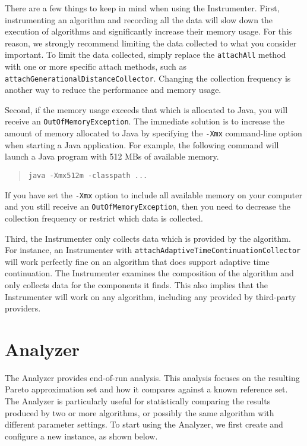 There are a few things to keep in mind when using the Instrumenter. First, instrumenting an algorithm and recording all the data will slow down the execution of algorithms and significantly increase their memory usage.  For this reason, we strongly recommend limiting the data collected to what you consider important.  To limit the data collected, simply replace the \texttt{attachAll} method with one or more specific attach methods, such as \texttt{attachGenerationalDistanceCollector}.  Changing the collection frequency is another way to reduce the performance and memory usage.

Second, if the memory usage exceeds that which is allocated to Java, you will receive an \texttt{OutOfMemoryException}.  The immediate solution is to increase the amount of memory allocated to Java by specifying the \texttt{-Xmx} command-line option when starting a Java application.  For example, the following command will launch a Java program with 512 MBs of available memory.

\begin{quote}
  \texttt{java -Xmx512m -classpath ...}
\end{quote}

If you have set the \texttt{-Xmx} option to include all available memory on your computer and you still receive an \texttt{OutOfMemoryException}, then you need to decrease the collection frequency or restrict which data is collected.

Third, the Instrumenter only collects data which is provided by the algorithm.  For instance, an Instrumenter with \texttt{attachAdaptiveTimeContinuationCollector} will work perfectly fine on an algorithm that does support adaptive time continuation.  The Instrumenter examines the composition of the algorithm and only collects data for the components it finds.  This also implies that the Instrumenter will work on any algorithm, including any provided by third-party providers.

\section{Analyzer}
The Analyzer provides end-of-run analysis.  This analysis focuses on the resulting Pareto approximation set and how it compares against a known reference set.  The Analyzer is particularly useful for statistically comparing the results produced by two or more algorithms, or possibly the same algorithm with different parameter settings.  To start using the Analyzer, we first create and configure a new instance, as shown below.

